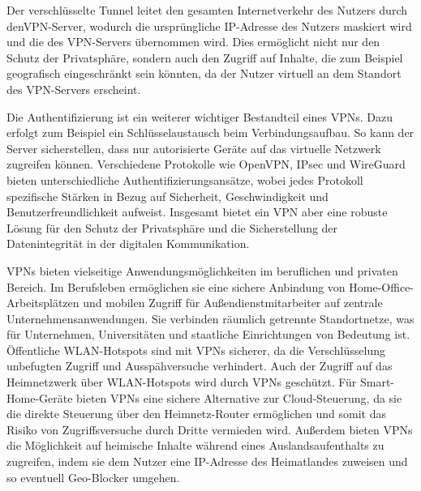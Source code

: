Der verschlüsselte Tunnel leitet den gesamten Internetverkehr des Nutzers durch den\gls{VPN}-Server, wodurch die ursprüngliche IP-Adresse des Nutzers maskiert wird und die des \gls{VPN}-Servers übernommen wird. Dies ermöglicht nicht nur den Schutz der Privatsphäre, sondern auch den Zugriff auf Inhalte, die zum Beispiel geografisch eingeschränkt sein könnten, da der Nutzer virtuell an dem Standort des \gls{VPN}-Servers erscheint. \cite{Vergleich_der_besten_VPN-Protokolle_Nord_VPN}\cite{Wie_funktioniert_ein_Virtual_Private_Network_VPN}

Die Authentifizierung ist ein weiterer wichtiger Bestandteil eines \gls{VPN}s. Dazu erfolgt zum Beispiel ein Schlüsselaustausch beim Verbindungsaufbau. So kann der Server sicherstellen, dass nur autorisierte Geräte auf das virtuelle Netzwerk zugreifen können. Verschiedene Protokolle wie OpenVPN, IPsec und WireGuard bieten unterschiedliche Authentifizierungsansätze, wobei jedes Protokoll spezifische Stärken in Bezug auf Sicherheit, Geschwindigkeit und Benutzerfreundlichkeit aufweist. Insgesamt bietet ein \gls{VPN} aber eine robuste Lösung für den Schutz der Privatsphäre und die Sicherstellung der Datenintegrität in der digitalen Kommunikation. \cite{Wie_funktioniert_ein_Virtual_Private_Network_VPN}

\gls{VPN}s bieten vielseitige Anwendungsmöglichkeiten im beruflichen und privaten Bereich. Im Berufsleben ermöglichen sie eine sichere Anbindung von Home-Office-Arbeitsplätzen und mobilen Zugriff für Außendienstmitarbeiter auf zentrale Unternehmensanwendungen. Sie verbinden räumlich getrennte Standortnetze, was für Unternehmen, Universitäten und staatliche Einrichtungen von Bedeutung ist. Öffentliche WLAN-Hotspots sind mit \gls{VPN}s sicherer, da die Verschlüsselung unbefugten Zugriff und Ausspähversuche verhindert. Auch der Zugriff auf das Heimnetzwerk über WLAN-Hotspots wird durch \gls{VPN}s geschützt. Für Smart-Home-Geräte bieten \gls{VPN}s eine sichere Alternative zur Cloud-Steuerung, da sie die direkte Steuerung über den Heimnetz-Router ermöglichen und somit das Risiko von Zugriffsversuche durch Dritte vermieden wird. Außerdem bieten \gls{VPN}s die Möglichkeit auf heimische Inhalte während eines Auslandsaufenthalts zu zugreifen, indem sie dem Nutzer eine IP-Adresse des Heimatlandes zuweisen und so eventuell Geo-Blocker umgehen. \cite{Wie_funktioniert_ein_Virtual_Private_Network_VPN}



